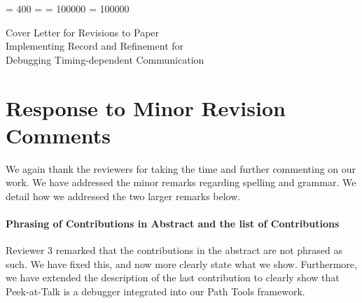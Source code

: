\documentclass[10pt]{article}
\begin{document}
\setlength{\topmargin}{1in}
\setlength{\headheight}{0pt}
\setlength{\headsep}{0pt}
\setlength{\evensidemargin}{.75in}
\setlength{\oddsidemargin}{.75in}
\newdimen{\standardtextwidth}
\setlength{\standardtextwidth}{42pc}
\setlength{\textwidth}{\standardtextwidth}
\setlength{\topskip}{8pt}
\setlength{\columnsep}{2pc}
\setlength{\textheight}{54.5pc}
\setlength{\parskip}{0pt}
\setlength{\parindent}{12pt}
\setlength{\lineskip}{.5pt}
\setlength{\lineskiplimit}{\lineskip}
\frenchspacing
\pretolerance = 400
\tolerance = \pretolerance
\setlength{\emergencystretch}{5pt}
\clubpenalty = 100000
\widowpenalty = 100000
\setlength{\hfuzz}{.5pt}
\setlength{\marginparwidth}{36pt}
\setlength{\marginparsep}{2pt}
\setlength{\marginparpush}{8pt}
\setlength{\skip\footins}{8pt plus 3pt minus 1pt}
\setlength{\footnotesep}{9pt}

\date{}

\sloppy
\begin{center}
{\large Cover Letter for Revisions to Paper}\\
{\Large Implementing Record and Refinement for\\
  Debugging Timing-dependent Communication}  
\end{center}

\baselineskip

\section*{Response to Minor Revision Comments}
We again thank the reviewers for taking the time and further commenting on our
work. We have addressed the minor remarks regarding spelling and grammar. We
detail how we addressed the two larger remarks below.

\paragraph{Phrasing of Contributions in Abstract and the list of Contributions}
Reviewer 3 remarked that the contributions in the abstract are not phrased as
such. We have fixed this, and now more clearly state what we show. Furthermore,
we have extended the description of the last contribution to clearly show that
Peek-at-Talk is a debugger integrated into our Path Tools framework.
\end{document}

